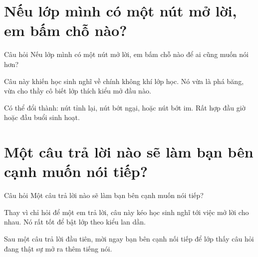 \section{Nếu lớp mình có một nút mở lời, em bấm chỗ nào?}
\begin{cauhoibox}{Câu hỏi}
Nếu lớp mình có một nút mở lời, em bấm chỗ nào để ai cũng muốn nói hơn?
\end{cauhoibox}
\begin{taisaocoich}
Câu này khiến học sinh nghĩ về chính không khí lớp học. Nó vừa là phá băng, vừa cho thầy cô biết lớp thích kiểu mở đầu nào.
\end{taisaocoich}
\begin{goiybien}
Có thể đổi thành: nút tỉnh lại, nút bớt ngại, hoặc nút bớt im. Rất hợp đầu giờ hoặc đầu buổi sinh hoạt.
\end{goiybien}
\ngancach

\section{Một câu trả lời nào sẽ làm bạn bên cạnh muốn nói tiếp?}
\begin{cauhoibox}{Câu hỏi}
Một câu trả lời nào sẽ làm bạn bên cạnh muốn nói tiếp?
\end{cauhoibox}
\begin{taisaocoich}
Thay vì chỉ hỏi để một em trả lời, câu này kéo học sinh nghĩ tới việc mở lời cho nhau. Nó rất tốt để bật lớp theo kiểu lan dần.
\end{taisaocoich}
\begin{goiybien}
Sau một câu trả lời đầu tiên, mời ngay bạn bên cạnh nối tiếp để lớp thấy câu hỏi đang thật sự mở ra thêm tiếng nói.
\end{goiybien}

